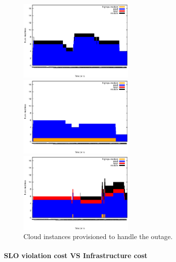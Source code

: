 \begin{figure}[htb]
	\begin{minipage}[b]{0.32\linewidth}
		\includegraphics[height=4cm]{images/exps2011/low/das/inst_type_machines.eps}	
		\vspace{-4mm}
	\end{minipage}
	\hfill
	\begin{minipage}[b]{0.32\linewidth}
		\includegraphics[height=4cm]{images/exps2011/medium/das/inst_type_machines.eps}
		\vspace{-4mm}
	\end{minipage}
\hfill
\begin{minipage}[b]{0.32\linewidth}
		\includegraphics[height=4cm]{images/exps2011/high/das/inst_type_machines.eps}
		\vspace{-4mm}
	\end{minipage}
\caption{Cloud instances provisioned to handle the outage.}
\label{fig:DASInstances}
\end{figure}

\paragraph{SLO violation cost VS Infrastructure cost}

